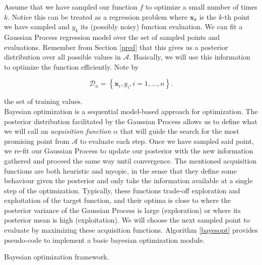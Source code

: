 \documentclass[10pt,a4paper,twoside]{book}
\DeclareMathOperator*{\argmax}{arg\,max}
\begin{document}
Assume that we have sampled our function $f$ to optimize a small number of times $k$. Notice this can be treated as a regression problem where $\boldsymbol{x}_k$ is the $k$-th point we have sampled and $y_k$ its (possibly noisy) function evaluation. We can fit a Gaussian Process regression model over the set of sampled points and evaluations. Remember from Section \ref{pred} that this gives us a posterior distribution over all possible values in $\mathcal{A}$. Basically, we will use this information to optimize the function efficiently. Note by

\begin{equation}
\mathcal{D}_n = \left\lbrace \boldsymbol{x}_i, y_i, i=1,\dots,n\right\rbrace.
\end{equation}

the set of training values.\\

Bayesian optimization is a sequential model-based approach for optimization. The posterior distribution facilitated by the Gaussian Process allows us to define what we will call an \textit{acquisition function} $\alpha$ that will guide the search for the most promising point from $\mathcal{A}$ to evaluate each step. Once we have sampled said point, we re-fit our Gaussian Process to update our posterior with the new information gathered and proceed the same way until convergence. The mentioned acquisition functions are both heuristic and myopic, in the sense that they define some behaviour given the posterior and only take the information available at a single step of the optimization. Typically, these functions trade-off exploration and exploitation of the target function, and their optima is close to where the posterior variance of the Gaussian Process is large (exploration) or where its posterior mean is high (exploitation). We will choose the next sampled point to evaluate by maximizing these acquisition functions. Algorithm \ref{bayesopt} provides pseudo-code to implement a basic bayesian optimization module.


\begin{algorithm}
	\caption{Bayesian optimization framework.}
		\label{bayesopt}
		\begin{algorithmic}[1]
				\State{$\boldsymbol{x}_{n+1} \gets \argmax_{\boldsymbol{x}} \alpha(\boldsymbol{x}, \mathcal{D}_n)$}
			\EndFor
		\end{algorithmic}
\end{algorithm}
\end{document}
